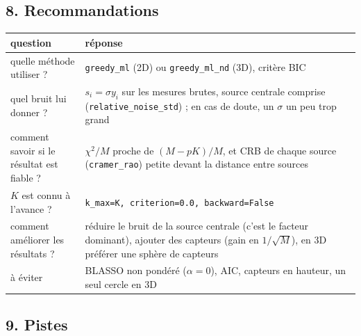 \documentclass[
  french,
]{article}
\newcounter{none} %
\begin{document}
\subsection{8. Recommandations}\label{recommandations}

{\def\LTcaptype{none} %
\begin{longtable}[]{@{}
  >{\raggedright\arraybackslash}p{}
  >{\raggedright\arraybackslash}p{}@{}}
\toprule\noalign{}
\begin{minipage}[b]{\linewidth}\raggedright
question
\end{minipage} & \begin{minipage}[b]{\linewidth}\raggedright
réponse
\end{minipage} \\
\midrule\noalign{}
\endhead
\bottomrule\noalign{}
\endlastfoot
quelle méthode utiliser ? & \texttt{greedy\_ml} (2D) ou
\texttt{greedy\_ml\_nd} (3D), critère BIC \\
quel bruit lui donner ? & \(s_i = \sigma y_i\) sur les mesures brutes,
source centrale comprise (\texttt{relative\_noise\_std}) ; en cas de
doute, un \(\sigma\) un peu trop grand \\
comment savoir si le résultat est fiable ? & \(\chi^2/M\) proche de
\((M - pK)/M\), et CRB de chaque source (\texttt{cramer\_rao}) petite
devant la distance entre sources \\
\(K\) est connu à l'avance ? &
\texttt{k\_max=K,\ criterion=0.0,\ backward=False} \\
comment améliorer les résultats ? & réduire le bruit de la source
centrale (c'est le facteur dominant), ajouter des capteurs (gain en
\(1/\sqrt M\)), en 3D préférer une sphère de capteurs \\
à éviter & BLASSO non pondéré (\(\alpha = 0\)), AIC, capteurs en
hauteur, un seul cercle en 3D \\
\end{longtable}
}

\subsection{9. Pistes}\label{pistes}
\end{document}
